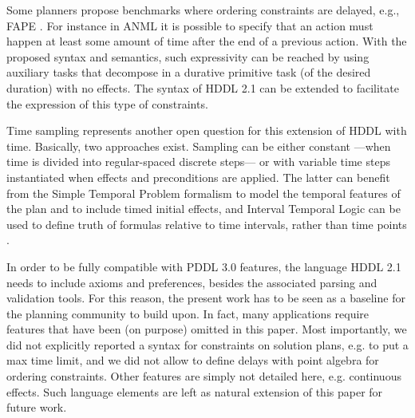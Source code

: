 \documentclass[letterpaper]{article} %
\begin{document}
Some planners propose benchmarks where ordering constraints are delayed, e.g., FAPE \cite{dvorak2014}.%
For instance in ANML it is possible to specify that an action must happen at least some amount of time after the end of a previous action. With the proposed syntax and semantics, such expressivity can be reached by using auxiliary tasks that decompose in a durative primitive task (of the desired duration) with no effects. The syntax of HDDL 2.1 can be extended to facilitate the expression of this type of constraints.

Time sampling represents another open question for this extension of HDDL with time.
Basically, two approaches exist. Sampling can be either constant ---when time is divided into regular-spaced discrete steps--- or with variable time steps instantiated when effects and preconditions are applied. The latter can benefit from the Simple Temporal Problem formalism to model the temporal features of the plan and to include timed initial effects, and Interval Temporal Logic can be used to define truth of formulas relative to time intervals, rather than time points \citep{BRESOLIN2014269}.



In order to be fully compatible with PDDL 3.0 features, the language HDDL 2.1 needs to include axioms and preferences, besides the associated parsing and validation tools. For this reason, the present work has to be seen as a baseline for the planning community to build upon.
In fact, many applications require features that have been (on purpose) omitted in this paper. Most importantly, we did not explicitly reported a syntax for constraints on solution plans, e.g. to put a max time limit, and we did not allow to define delays  with point algebra for ordering constraints. Other features are simply not detailed here, e.g. continuous effects.
Such language elements are left as natural extension of this paper for future work.

\newpage



\end{document}
